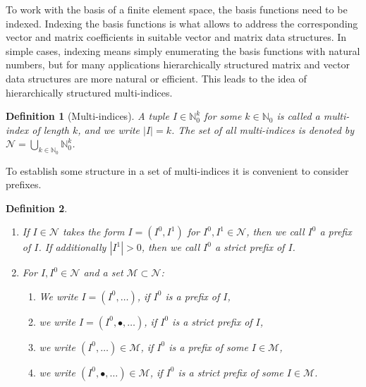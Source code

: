 \documentclass[a4paper,10pt,headings=normal,bibliography=totoc]{scrartcl}
\newtheorem{definition}{Definition}
\newcommand{\N}{\mathbb{N}}
\begin{document}
To work with the basis of a finite element space, the basis functions need to be indexed.  Indexing the basis functions
is what allows to address the corresponding vector and matrix coefficients in suitable vector and matrix data structures.
In simple cases, indexing means simply enumerating the basis functions with natural numbers, but for many applications
hierarchically structured matrix and vector data structures are more natural or efficient.  This leads to the idea
of hierarchically structured multi-indices.
%
\begin{definition}[Multi-indices]
 A tuple $I \in \N_0^k$ for some $k \in \N_0$ is called a multi-index of length $k$,
 and we write $|I|=k$.
 The set of all multi-indices is denoted by
 $\mathcal{N} = \bigcup_{k \in \N_0} \N_0^k$.
\end{definition}
%
To establish some structure in a set of multi-indices it is convenient to consider prefixes.
%
\begin{definition}\mbox{}  %
    \begin{enumerate}
        \item
            If $I \in \mathcal{N}$ takes the form $I = (I^0,I^1)$ for $I^0,I^1 \in \mathcal{N}$,
            then we call $I^0$ a prefix of $I$.
            If additionally $|I^1|>0$, then we call $I^0$ a strict prefix of $I$.
        \item
            For $I,I^0 \in \mathcal{N}$ and a set $\mathcal{M} \subset \mathcal{N}$:
            \begin{enumerate}
              \item
                We write $I=(I^0,\dots)$, if $I^0$ is a prefix of $I$,
              \item
                we write $I=(I^0,\bullet,\dots)$, if $I^0$ is a strict prefix of $I$,
              \item
                we write $(I^0,\dots) \in \mathcal{M}$, if $I^0$ is a prefix of some
                $I \in \mathcal{M}$,
              \item
                we write $(I^0,\bullet,\dots) \in \mathcal{M}$, if $I^0$ is a strict prefix of some
                $I \in \mathcal{M}$.
            \end{enumerate}
    \end{enumerate}
\end{definition}
\end{document}
